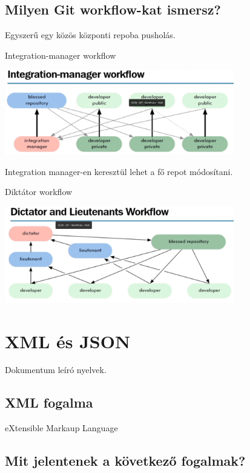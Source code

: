 \documentclass[a4paper,14pt]{extarticle}
\begin{document}
		\subsection{Milyen Git workflow-kat ismersz? }
		\begin{compactitem}
			\item Egyszerű egy közös központi repoba pusholás.
			\item Integration-manager workflow 
			\newline
			\begin{center}
				\includegraphics[width=10cm]{imwf}
			\end{center}
			Integration manager-en keresztül lehet a fő repot módosítani.
			\item Diktátor workflow
			\newline
			\begin{center}
				\includegraphics[width=10cm]{dictator}
			\end{center}
			
		\end{compactitem}
			
	\section{XML és JSON}
	Dokumentum leíró nyelvek.
		\subsection{XML fogalma}
		eXtensible Markaup Language
		\subsection{Mit jelentenek a következő fogalmak?}
\end{document}
